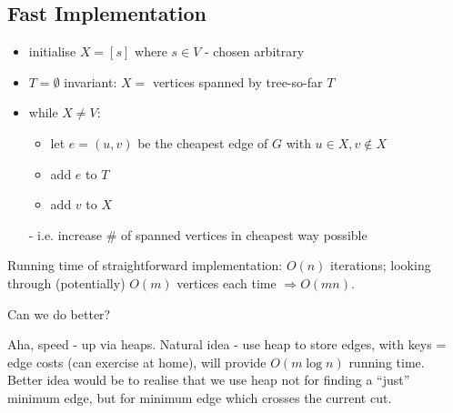 \documentclass{scrartcl}
\begin{document}
\subsection{Fast Implementation}
\label{sec:5-6}
\begin{itemize}
\item initialise $X = [s]$ where $s \in V$ - chosen arbitrary
\item $T = \emptyset$ invariant: $X = $ vertices spanned by tree-so-far $T$
\item while $X \neq V$:
  \begin{itemize}
  \item let $e = (u, v)$ be the cheapest edge of $G$ with $u \in X, v \notin X$
  \item add $e$ to $T$
  \item add $v$ to $X$
  \end{itemize}
  - i.e. increase \# of spanned vertices in cheapest way possible
\end{itemize}
Running time of straightforward implementation: $O(n)$ iterations; looking
through (potentially) $O(m)$ vertices each time $\Rightarrow O(mn)$.

Can we do better?

Aha, speed - up via heaps. Natural idea - use heap to store edges, with keys =
edge costs (can exercise at home), will provide $O(m \log n)$ running time.\\
Better idea would be to realise that we use heap not for finding a ``just''
minimum edge, but for minimum edge which crosses the current cut.
\end{document}
